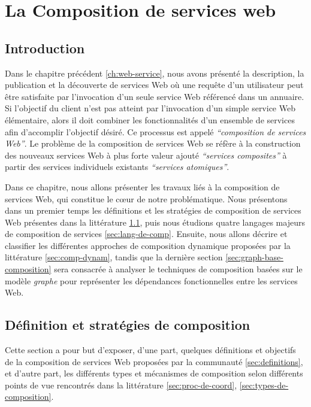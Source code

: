 \chapter{La Composition de services web}
\label{ch:composition}

\section*{Introduction}
 

Dans le chapitre précédent \ref{ch:web-service}, nous avons présenté
la description, la publication et la découverte de services Web où une
requête d'un utilisateur peut être satisfaite par l'invocation d'un
seule service Web référencé dans un annuaire. Si l'objectif du client
n'est pas atteint par l'invocation d'un simple service Web
élémentaire, alors il doit combiner les fonctionnalités d'un ensemble
de services afin d'accomplir l'objectif désiré. Ce processus est
appelé \textit{``composition de services Web''}. Le problème de la
composition de services Web se réfère à la construction des nouveaux
services Web à plus forte valeur ajouté \textit{``services
  composites''} à partir des services individuels existants
\textit{``services atomiques''}.\bigskip

Dans ce chapitre, nous allons présenter les travaux liés à la
composition de services Web, qui constitue le cœur de notre
problématique. Nous présentons dans un premier temps les définitions
et les stratégies de composition de services Web présentes dans la
littérature \ref{sec:defs}, puis nous étudions quatre langages majeurs
de composition de services \ref{sec:lang-de-comp}. Ensuite, nous
allons décrire et classifier les différentes approches de composition
dynamique proposées par la littérature \ref{sec:comp-dynam}, tandis
que la dernière section \ref{sec:graph-base-composition} sera
consacrée à analyser le techniques de composition basées sur le modèle
\textit{graphe} pour représenter les dépendances fonctionnelles entre
les services Web.

\newpage
\section{Définition et stratégies de composition}
\label{sec:defs}
Cette section a pour but d'exposer, d'une part, quelques définitions
et objectifs de la composition de services Web proposées par la
communauté \ref{sec:definitions}, et d'autre part, les différents
types et mécanismes de composition selon différents points de vue
rencontrés dans la littérature \ref{sec:proc-de-coord},
\ref{sec:types-de-composition}.

